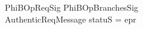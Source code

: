 \begin{LNewSDef}
\begin{schema}{PhiBOpReqSig}
    PhiBOpBranchesSig \\
    AuthenticReqMessage
\where
    statuS = epr
    \also

%
%
%
\end{schema}~\end{LNewSDef}

